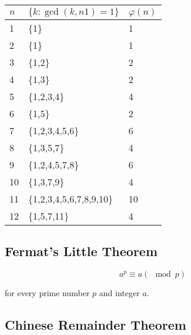 \documentclass[11pt]{article}
\theoremstyle{plain}
\theoremstyle{definition}
\begin{document}
\begin{center}
  \begin{tabular}{l l l}
    $n$ & $\{k : \gcd(k, n1) = 1\}$ & $\varphi(n)$ \\
    \hline
    1  & \{1\}                    & 1 \\
    2  & \{1\}                    & 1 \\
    3  & \{1,2\}                  & 2 \\
    4  & \{1,3\}                  & 2 \\
    5  & \{1,2,3,4\}              & 4 \\
    6  & \{1,5\}                  & 2 \\
    7  & \{1,2,3,4,5,6\}          & 6 \\
    8  & \{1,3,5,7\}              & 4 \\
    9  & \{1,2,4,5,7,8\}          & 6 \\
    10 & \{1,3,7,9\}              & 4 \\
    11 & \{1,2,3,4,5,6,7,8,9,10\} & 10 \\
    12 & \{1,5,7,11\}             & 4 \\
  \end{tabular}
\end{center}

\subsection*{Fermat's Little Theorem}

$$
a^p \equiv a (\mod p)
$$

for every prime number $p$ and integer $a$.

\subsection*{Chinese Remainder Theorem}
\end{document}
